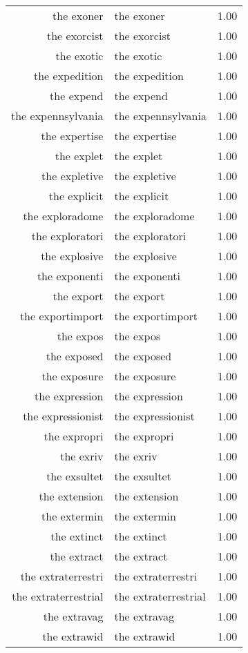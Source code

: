 \begin{table}[ht]
\begin{tabular}{rlr}
  the exoner & the exoner & 1.00 \\ 
  the exorcist & the exorcist & 1.00 \\ 
  the exotic & the exotic & 1.00 \\ 
  the expedition & the expedition & 1.00 \\ 
  the expend & the expend & 1.00 \\ 
  the expennsylvania & the expennsylvania & 1.00 \\ 
  the expertise & the expertise & 1.00 \\ 
  the explet & the explet & 1.00 \\ 
  the expletive & the expletive & 1.00 \\ 
  the explicit & the explicit & 1.00 \\ 
  the exploradome & the exploradome & 1.00 \\ 
  the exploratori & the exploratori & 1.00 \\ 
  the explosive & the explosive & 1.00 \\ 
  the exponenti & the exponenti & 1.00 \\ 
  the export & the export & 1.00 \\ 
  the exportimport & the exportimport & 1.00 \\ 
  the expos & the expos & 1.00 \\ 
  the exposed & the exposed & 1.00 \\ 
  the exposure & the exposure & 1.00 \\ 
  the expression & the expression & 1.00 \\ 
  the expressionist & the expressionist & 1.00 \\ 
  the expropri & the expropri & 1.00 \\ 
  the exriv & the exriv & 1.00 \\ 
  the exsultet & the exsultet & 1.00 \\ 
  the extension & the extension & 1.00 \\ 
  the extermin & the extermin & 1.00 \\ 
  the extinct & the extinct & 1.00 \\ 
  the extract & the extract & 1.00 \\ 
  the extraterrestri & the extraterrestri & 1.00 \\ 
  the extraterrestrial & the extraterrestrial & 1.00 \\ 
  the extravag & the extravag & 1.00 \\ 
  the extrawid & the extrawid & 1.00 \\ 

\end{tabular}
\end{table}
